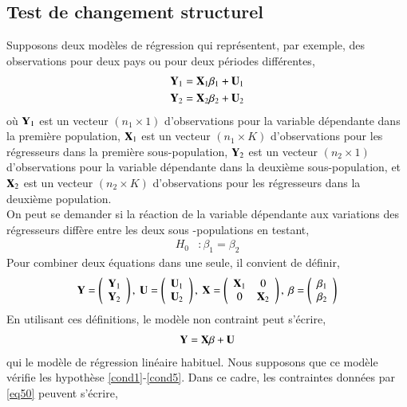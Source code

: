\documentclass[10pt, reqno]{amsart}
\begin{document}
\subsection{Test de changement structurel}
Supposons deux modèles de régression qui représentent, par exemple, des observations pour deux pays ou pour  deux périodes différentes,
\begin{align*}
\mathbf Y_1 &= \mathbf X_1\beta_1 + \mathbf U_1\\
\mathbf Y_2 &= \mathbf X_2\beta_2 + \mathbf U_2
\end{align*}
où $\mathbf Y_1$ est un vecteur $(n_1\times 1)$ d'observations pour la variable dépendante dans la première population, $\mathbf X_1$ est un vecteur $(n_1\times K)$ d'observations pour les régresseurs dans la première sous-population,  $\mathbf Y_2$ est un vecteur $(n_2\times 1)$ d'observations pour la variable dépendante dans la deuxième sous-population, et $\mathbf X_2$ est un vecteur $(n_2\times K)$ d'observations pour les régresseurs dans la deuxième population.\\
On peut se demander si la réaction de la variable dépendante aux variations des régresseurs diffère entre les deux sous -populations en testant,
\begin{align}
H_0 &: \beta_1=\beta_2
\label{eq50}
\end{align}
Pour combiner deux équations dans une seule, il convient de définir,
\begin{align*}
\boldY = 
\left(
\begin{array}{c}
\boldY_1\\
\boldY_2
\end{array}
\right)
, \ 
\boldU = 
\left(
\begin{array}{c}
\boldU_1\\
\boldU_2
\end{array}
\right)
, \
\boldX = 
\left(
\begin{array}{cc}
\boldX_1&0\\
0&\boldX_2
\end{array}
\right)
, \
\beta = 
\left(
\begin{array}{c}
\beta_1\\
\beta_2
\end{array}
\right)
\end{align*}
En utilisant ces définitions, le modèle non contraint peut s'écrire,
\begin{align}
\mathbf Y = \mathbf X\beta + \mathbf U
\label{eq51}
\end{align}
qui le modèle de régression linéaire habituel. Nous supposons que ce modèle vérifie les hypothèse \ref{cond1}-\ref{cond5}. Dans ce cadre, les contraintes données par \eqref{eq50} peuvent s'écrire,
\end{document}
